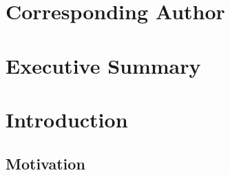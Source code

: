 \documentclass[11pt,a4paper,twoside,onecolumn,openany,final,oldfontcommands]{memoir}
\begin{document}


\frontmatter

\thispagestyle{empty}  %

\clearpage
\setupmaintoc
\tableofcontents 

\clearpage
\listoffigures

\clearpage
\listoftables

\chapter{Corresponding Author}
%



\chapter{Executive Summary}




\mainmatter

\chapter{Introduction}

\section{Motivation}
\end{document}
